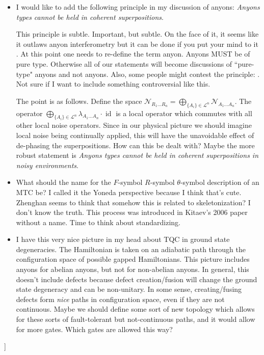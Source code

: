 \documentclass{article}
\theoremstyle{definition}
\DeclareMathOperator{\id}{id}
\newcommand{\NN}{\mathcal{N}}
\newcommand{\LL}{\mathcal{L}}
\newcommand{\0}{\left|0\right>}
\newcommand{\1}{\left|1\right>}
\numberwithin{figure}{section}
\begin{document}
\begin{itemize}
\item I would like to add the following principle in my discussion of anyons: \textit{Anyons types cannot be held in coherent superpositions}.

This principle is subtle. Important, but subtle. On the face of it, it seems like it outlaws anyon interferometry but it can be done if you put your mind to it \cite{bonderson2012non, wei2023thermal}. At this point one needs to re-define the term anyon. Anyons MUST be of pure type. Otherwise all of our  statements will become discussions of ``pure-type" anyons and not anyons. Also, some people might contest the principle: \cite{bonderson2021measuring}. Not sure if I want to include something controversial like this.

The point is as follows. Define the space $\NN_{R_1... R_n}=\bigoplus_{\{A_i\}\in \LL^n}\NN_{A_1... A_n}$. The operator $\bigoplus_{\{A_i\}\in \LL^n} \lambda_{A_1... A_n}\cdot \id$ is a local operator which commutes with all other local noise operators. Since in our physical picture we should imagine local noise being continually applied, this will have the unavoidable effect of de-phasing the superpositions. How can this be dealt with? Maybe the more robust statement is \textit{Anyons types cannot be held in coherent superpositions in noisy environments}.

\item What should the name for the $F$-symbol $R$-symbol $\theta$-symbol description of an MTC be? I called it the Yoneda perspective because I think that's cute. Zhenghan seems to think that somehow this is related to skeletonization? I don't know the truth. This process was introduced in Kitaev's 2006 paper without a name. Time to think about standardizing.

\item I have this very nice picture in my head about TQC in ground state degeneracies. The Hamiltonian is taken on an adiabatic path through the configuration space of possible gapped Hamiltonians. This picture includes anyons for abelian anyons, but not for non-abelian anyons. In general, this doesn't include defects because defect creation/fusion will change the ground state degeneracy and can be non-unitary.  In some sense, creating/fusing defects form \textit{nice} paths in configuration space, even if they are not continuous. Maybe we should define some sort of new topology which allows for these sorts of fault-tolerant but not-continuous paths, and it would allow for more gates. Which gates are allowed this way?
\end{itemize}
]




\end{document}

